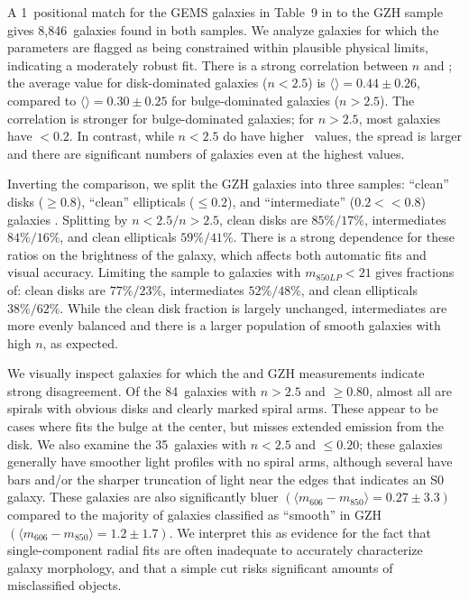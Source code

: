 \documentclass[twocolumn]{aastex6}
\begin{document}
A 1\arcsec~positional match for the GEMS galaxies in Table~9 in \citet{hau07} to the GZH sample gives 8,846~galaxies found in both samples. We analyze galaxies for which the \galfit{} parameters are flagged as being constrained within plausible physical limits, indicating a moderately robust fit. There is a strong correlation between $n$ and \pbest; the average value for disk-dominated galaxies ($n<2.5$) is $\langle$\pbest$\rangle=0.44\pm0.26$, compared to $\langle$\pbest$\rangle=0.30\pm0.25$ for bulge-dominated galaxies ($n>2.5$). The correlation is stronger for bulge-dominated galaxies; for $n>2.5$, most galaxies have \pbest$<0.2$. In contrast, while $n<2.5$ do have higher \pbest~values, the spread is larger and there are significant numbers of galaxies even at the highest \pbest{} values. 

Inverting the comparison, we split the GZH galaxies into three samples: ``clean'' disks (\pbest$\ge0.8$), ``clean'' ellipticals (\pbest$\le0.2$), and ``intermediate'' ($0.2<$\pbest$<0.8$) galaxies \citep[eg,][]{sch14}. Splitting by $n<2.5/n>2.5$, clean disks are $85\%/17\%$, intermediates $84\%/16\%$, and clean ellipticals $59\%/41\%$. There is a strong dependence for these ratios on the brightness of the galaxy, which affects both automatic fits and visual accuracy. Limiting the sample to galaxies with $m_{850LP}<21$ gives fractions of: clean disks are $77\%/23\%$, intermediates $52\%/48\%$, and clean ellipticals $38\%/62\%$. While the clean disk fraction is largely unchanged, intermediates are more evenly balanced and there is a larger population of smooth galaxies with high $n$, as expected.

We visually inspect galaxies for which the \galfit{} and GZH measurements indicate strong disagreement. Of the 84~galaxies with $n>2.5$ and \pbest$\ge0.80$, almost all are spirals with obvious disks and clearly marked spiral arms. These appear to be cases where \galfit{} fits the bulge at the center, but misses extended emission from the disk. We also examine the 35~galaxies with $n<2.5$ and \pbest$\le0.20$; these galaxies generally have smoother light profiles with no spiral arms, although several have bars and/or the sharper truncation of light near the edges that indicates an S0 galaxy. These galaxies are also significantly bluer $(\langle m_{606}-m_{850}\rangle=0.27\pm3.3)$ compared to the majority of galaxies classified as ``smooth'' in GZH $(\langle m_{606}-m_{850}\rangle=1.2\pm1.7)$. We interpret this as evidence for the fact that single-component radial fits are often inadequate to accurately characterize galaxy morphology, and that a simple cut risks significant amounts of misclassified objects. 
\end{document}
